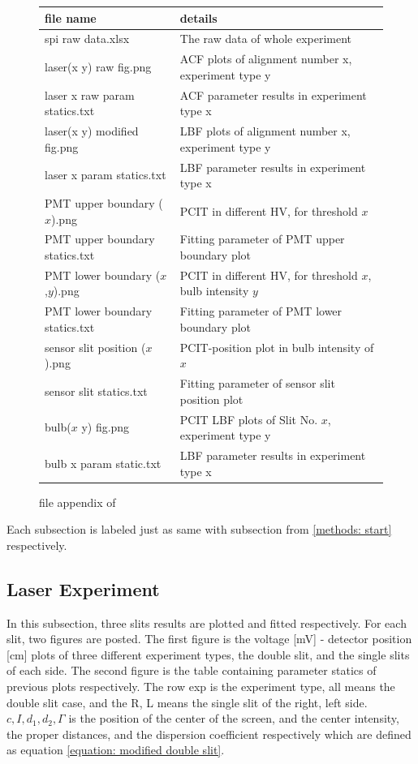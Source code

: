 \documentclass{article}
\begin{document}
\begin{figure}[H]
    \begin{tabular}{  m{5.2cm} | m{8.7cm} } 

      file name& details \\ 
      \hline
      \hline
        spi raw data.xlsx & The raw data of whole experiment\\
      \hline
        laser(x y) raw fig.png & ACF plots of alignment number x, experiment type y\\
      \hline
        laser x raw param statics.txt & ACF parameter results in experiment type x\\
      \hline
        laser(x y) modified fig.png & LBF plots of alignment number x, experiment type y\\
      \hline
        laser x param statics.txt & LBF parameter results in experiment type x\\
      \hline
        PMT upper boundary ($x$).png & PCIT in different HV, for threshold $x$\\
      \hline
        PMT upper boundary statics.txt & Fitting parameter of PMT upper boundary plot\\
      \hline
        PMT lower boundary ($x$,$y$).png & PCIT in different HV, for threshold $x$, bulb intensity $y$\\
      \hline
        PMT lower boundary statics.txt & Fitting parameter of PMT lower boundary plot\\
      \hline
        sensor slit position ($x$).png & PCIT-position plot in bulb intensity of $x$\\
      \hline
        sensor slit statics.txt & Fitting parameter of sensor slit position plot\\
      \hline
        bulb($x$ y) fig.png & PCIT LBF plots of Slit No. $x$, experiment type y\\
      \hline
        bulb x param static.txt & LBF parameter results in experiment type x \\

    \end{tabular}
    \caption{file appendix of \cite{github}}
    \label{fig: file_appendix}
\end{figure}

Each subsection is labeled just as same with subsection from \ref{methods: start} respectively.
\subsection{Laser Experiment}
In this subsection, three slits results are plotted and fitted respectively.
For each slit, two figures are posted.
The first figure is the voltage [mV] - detector position [cm] plots of three different experiment types, the double slit, and the single slits of each side. 
The second figure is the table containing parameter statics of previous plots respectively.
The row exp is the experiment type, all means the double slit case, and the R, L means the single slit of the right, left side.
$c, I,d_1,d_2,\Gamma$ is the position of the center of the screen, and the center intensity, the proper distances, and the dispersion coefficient respectively which are defined as equation \ref{equation: modified double slit}.
\end{document}

